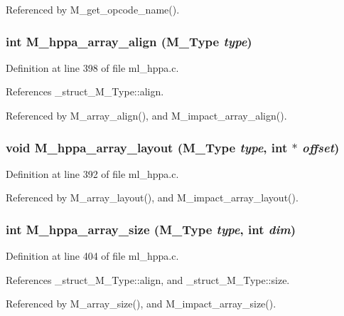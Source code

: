 Referenced by M\_\-get\_\-opcode\_\-name().
\subsubsection{\setlength{\rightskip}{0pt plus 5cm}int M\_\-hppa\_\-array\_\-align (\bf{M\_\-Type} {\em type})}\label{ml__hppa_8c_ec186a71c49e8fc22e414e5c070966f2}




Definition at line 398 of file ml\_\-hppa.c.

References \_\-struct\_\-M\_\-Type::align.

Referenced by M\_\-array\_\-align(), and M\_\-impact\_\-array\_\-align().
\subsubsection{\setlength{\rightskip}{0pt plus 5cm}void M\_\-hppa\_\-array\_\-layout (\bf{M\_\-Type} {\em type}, int $\ast$ {\em offset})}\label{ml__hppa_8c_c435729f60c6697c5464f5ec86173032}




Definition at line 392 of file ml\_\-hppa.c.

Referenced by M\_\-array\_\-layout(), and M\_\-impact\_\-array\_\-layout().
\subsubsection{\setlength{\rightskip}{0pt plus 5cm}int M\_\-hppa\_\-array\_\-size (\bf{M\_\-Type} {\em type}, int {\em dim})}\label{ml__hppa_8c_7a5dd1ad548213f4facd4c5d78bec232}




Definition at line 404 of file ml\_\-hppa.c.

References \_\-struct\_\-M\_\-Type::align, and \_\-struct\_\-M\_\-Type::size.

Referenced by M\_\-array\_\-size(), and M\_\-impact\_\-array\_\-size().
